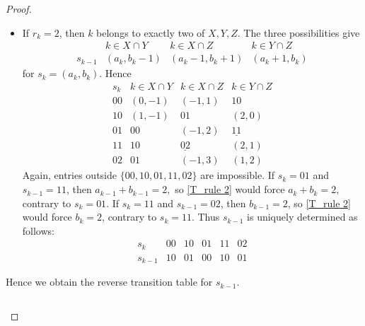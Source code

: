 \documentclass[11pt]{amsart}
\theoremstyle{definition}
\numberwithin{equation}{section}
\begin{document}
\begin{proof}
\begin{itemize}
$$\begin{array}{c|ccc}
11 & 01 & (2,0) & (1,2)\\
02 & (-1,2) & 11 & (0,3)
\end{array}
$$
Entries not belonging to the state set
$
\{00,10,01,11,02\}
$
are impossible.
In addition, if \(s_k=10\) and \(s_{k-1}=11\), then
$
a_{k-1}+b_{k-1}=2,
$
so \eqref{T_rule 2} would imply \(a_k+b_k=2\), contrary to \(s_k=10\).  Similarly, if \(s_k=01\) and \(s_{k-1}=02\), then \(b_{k-1}=2\), so \eqref{T_rule 2} would imply \(b_k=2\), contrary to \(s_k=01\).
Thus $s_{k-1}$ is uniquely determined as follows:
$$
\begin{array}{c|ccccc}
s_k&00&10&01&11&02\\
\hline
s_{k-1}&01&00&10&01&11
\end{array}
$$


    \item 
    If \(r_k=2\), then \(k\) belongs to exactly two of \(X,Y,Z\).  The three possibilities give
$$
\begin{array}{c|ccc}
 & k\in X\cap Y & k\in X\cap Z & k\in Y\cap Z\\
\hline
s_{k-1}
&
(a_k,b_k-1)
&
(a_k-1,b_k+1)
&
(a_k+1,b_k)
\end{array}
$$
for \(s_k=(a_k,b_k)\).  Hence
$$
\begin{array}{c|ccc}
s_k
& k\in X\cap Y
& k\in X\cap Z
& k\in Y\cap Z\\
\hline
00 & (0,-1) & (-1,1) & 10\\
10 & (1,-1) & 01 & (2,0)\\
01 & 00 & (-1,2) & \underline{11}\\
11 & 10 & \underline{02} & (2,1)\\
02 & 01 & (-1,3) & (1,2)
\end{array}
$$
Again, entries outside
$
\{00,10,01,11,02\}
$
are impossible.  
If \(s_k=01\) and \(s_{k-1}=11\), then
$
a_{k-1}+b_{k-1}=2,
$
so \eqref{T_rule 2} would force \(a_k+b_k=2\), contrary to \(s_k=01\).  If \(s_k=11\) and \(s_{k-1}=02\), then \(b_{k-1}=2\), so \eqref{T_rule 2} would force \(b_k=2\), contrary to \(s_k=11\).
Thus $s_{k-1}$ is uniquely determined as follows:
$$
\begin{array}{c|ccccc}
s_k&00&10&01&11&02\\
\hline
s_{k-1}&10&01&00&10&01
\end{array}
$$
\end{itemize}
Hence we obtain the reverse transition table for $s_{k-1}$.
\begin{center}
\begin{tabular}{c|ccc}
\toprule

\end{tabular}
\end{center}
\end{proof}
\end{document}
